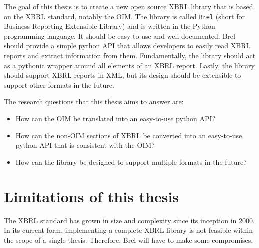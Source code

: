 The goal of this thesis is to create a new open source XBRL library that is based on the XBRL standard, notably the OIM.
The library is called \texttt{Brel} (short for Business Reporting Extensible Library) and is written in the Python programming language.
It should be easy to use and well documented.
Brel should provide a simple python API that allows developers to easily read XBRL reports and extract information from them.
Fundamentally, the library should act as a pythonic wrapper around all elements of an XBRL report.
Lastly, the library should support XBRL reports in XML, but its design should be extensible to support other formats in the future.

The research questions that this thesis aims to answer are:

\begin{itemize}
    \item How can the OIM be translated into an easy-to-use python API?\label{itm:research_question_1}
    \item How can the non-OIM sections of XBRL be converted into an easy-to-use python API that is consistent with the OIM?\label{itm:research_question_2}
    \item How can the library be designed to support multiple formats in the future?\label{itm:research_question_3}
\end{itemize}

\section{Limitations of this thesis}

The XBRL standard has grown in size and complexity since its inception in 2000.
In its current form, implementing a complete XBRL library is not feasible within the scope of a single thesis.
Therefore, Brel will have to make some compromises.

